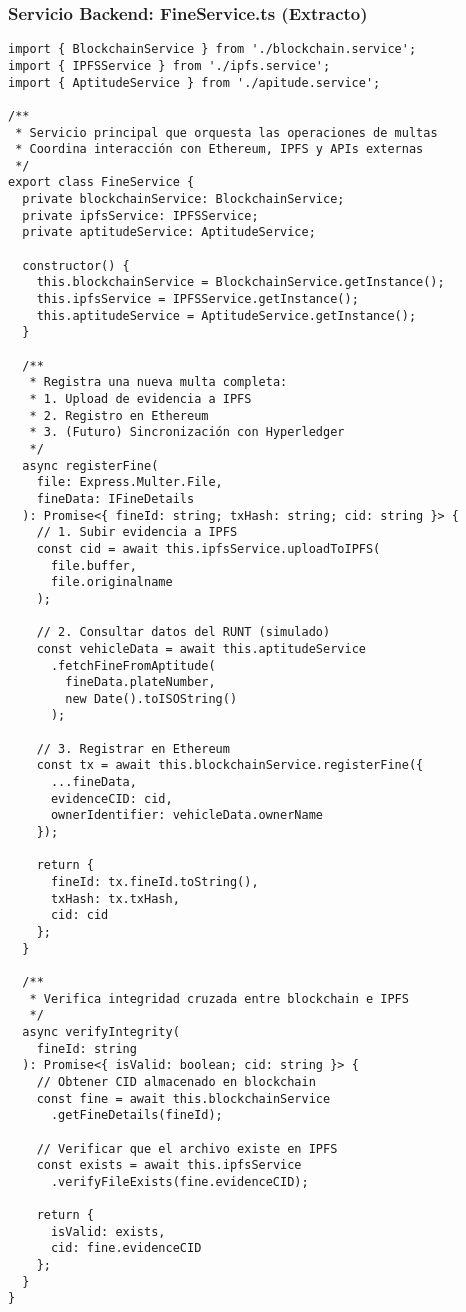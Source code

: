 \subsubsection{Servicio Backend: FineService.ts (Extracto)}

\begin{verbatim}
import { BlockchainService } from './blockchain.service';
import { IPFSService } from './ipfs.service';
import { AptitudeService } from './apitude.service';

/**
 * Servicio principal que orquesta las operaciones de multas
 * Coordina interacción con Ethereum, IPFS y APIs externas
 */
export class FineService {
  private blockchainService: BlockchainService;
  private ipfsService: IPFSService;
  private aptitudeService: AptitudeService;

  constructor() {
    this.blockchainService = BlockchainService.getInstance();
    this.ipfsService = IPFSService.getInstance();
    this.aptitudeService = AptitudeService.getInstance();
  }

  /**
   * Registra una nueva multa completa:
   * 1. Upload de evidencia a IPFS
   * 2. Registro en Ethereum
   * 3. (Futuro) Sincronización con Hyperledger
   */
  async registerFine(
    file: Express.Multer.File, 
    fineData: IFineDetails
  ): Promise<{ fineId: string; txHash: string; cid: string }> {
    // 1. Subir evidencia a IPFS
    const cid = await this.ipfsService.uploadToIPFS(
      file.buffer, 
      file.originalname
    );

    // 2. Consultar datos del RUNT (simulado)
    const vehicleData = await this.aptitudeService
      .fetchFineFromAptitude(
        fineData.plateNumber, 
        new Date().toISOString()
      );

    // 3. Registrar en Ethereum
    const tx = await this.blockchainService.registerFine({
      ...fineData,
      evidenceCID: cid,
      ownerIdentifier: vehicleData.ownerName
    });

    return {
      fineId: tx.fineId.toString(),
      txHash: tx.txHash,
      cid: cid
    };
  }

  /**
   * Verifica integridad cruzada entre blockchain e IPFS
   */
  async verifyIntegrity(
    fineId: string
  ): Promise<{ isValid: boolean; cid: string }> {
    // Obtener CID almacenado en blockchain
    const fine = await this.blockchainService
      .getFineDetails(fineId);
    
    // Verificar que el archivo existe en IPFS
    const exists = await this.ipfsService
      .verifyFileExists(fine.evidenceCID);

    return {
      isValid: exists,
      cid: fine.evidenceCID
    };
  }
}
\end{verbatim}

